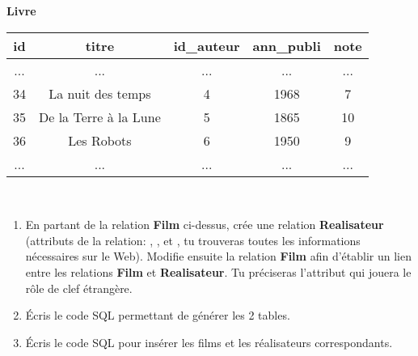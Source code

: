 \documentclass[a4paper,11pt,french]{book}
\begin{document}
\begin{center}
\textbf{Livre}\\[1em]

\begin{tabular}{|c|c|c|c|c|}
\hline
\rowcolor{UGLiOrange} \textbf{\color{white}id} &\textbf{\color{white}titre}&\textbf{\color{white}id\_auteur}&\textbf{\color{white}ann\_publi}&\textbf{\color{white}note}\\
\hline
...&...&...&...&...\\
34&La nuit des temps&4&1968&7\\
35&De la Terre à la Lune&5&1865&10\\
36&Les Robots&6&1950&9\\
...&...&...&...&...\\
\hline
\end{tabular}\\[2em]
\end{center}
\exo{}

\begin{enumerate}[\bfseries 1.]
	\item 	En partant de la relation \textbf{Film} ci-dessus, crée
    une relation \textbf{Realisateur} (attributs de la
    relation: , ,  et
    , tu trouveras toutes les
    informations nécessaires sur le Web).
    Modifie ensuite la relation \textbf{Film} afin d'établir
    un lien entre les relations \textbf{Film} et
    \textbf{Realisateur}. Tu préciseras l'attribut qui
    jouera le rôle de clef étrangère.

	\item 	\'Ecris le code \textsc{SQL} permettant de générer les 2 tables.
    \item   \'Ecris le code \textsc{SQL} pour insérer les films et les réalisateurs correspondants.
\end{enumerate}
\end{document}
